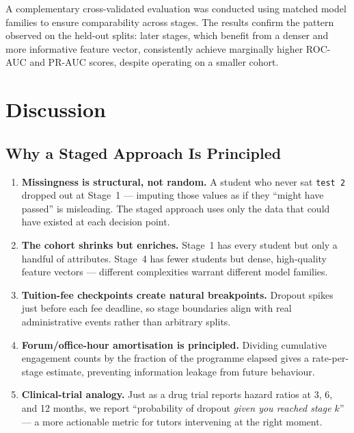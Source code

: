 \documentclass[8pt,twocolumn]{extarticle}
\begin{document}
A complementary cross-validated evaluation was conducted using matched
model families to ensure comparability across stages.  The results confirm
the pattern observed on the held-out splits: later stages, which benefit
from a denser and more informative feature vector, consistently achieve
marginally higher ROC-AUC and PR-AUC scores, despite operating on a
smaller cohort.

\section{Discussion}\label{sec:discussion}

\subsection{Why a Staged Approach Is Principled}

\begin{enumerate}
  \item \textbf{Missingness is structural, not random.}
        A student who never sat \texttt{test 2} dropped out at Stage~1 ---
        imputing those values as if they ``might have passed'' is misleading.
        The staged approach uses only the data that could have existed at each
        decision point.

  \item \textbf{The cohort shrinks but enriches.}
        Stage~1 has every student but only a handful of attributes.
        Stage~4 has fewer students but dense, high-quality feature vectors ---
        different complexities warrant different model families.

  \item \textbf{Tuition-fee checkpoints create natural breakpoints.}
        Dropout spikes just before each fee deadline, so stage boundaries
        align with real administrative events rather than arbitrary splits.

  \item \textbf{Forum/office-hour amortisation is principled.}
        Dividing cumulative engagement counts by the fraction of the programme
        elapsed gives a rate-per-stage estimate, preventing information leakage
        from future behaviour.

  \item \textbf{Clinical-trial analogy.}
        Just as a drug trial reports hazard ratios at 3, 6, and 12 months,
        we report ``probability of dropout \emph{given you reached stage $k$}''
        --- a more actionable metric for tutors intervening at the right moment.
\end{enumerate}
\end{document}
